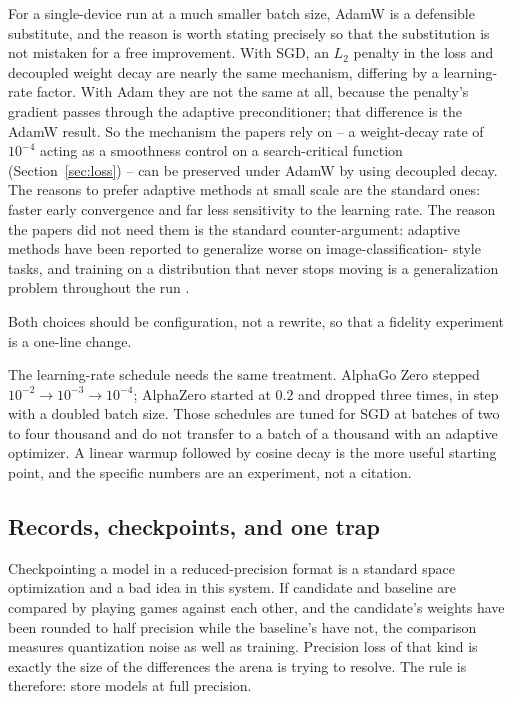 For a single-device run at a much smaller batch size, AdamW
\citep{kingma2014adam,loshchilov2017adamw} is a defensible substitute, and the
reason is worth stating precisely so that the substitution is not mistaken for a
free improvement. With SGD, an $L_2$ penalty in the loss and decoupled weight
decay are nearly the same mechanism, differing by a learning-rate factor. With
Adam they are not the same at all, because the penalty's gradient passes through
the adaptive preconditioner; that difference is the AdamW result. So the
mechanism the papers rely on -- a weight-decay rate of $10^{-4}$ acting as a
smoothness control on a search-critical function
(Section~\ref{sec:loss}) -- can be preserved under AdamW by using decoupled
decay. The reasons to prefer adaptive methods at small scale are the standard
ones: faster early convergence and far less sensitivity to the learning rate.
The reason the papers did not need them is the standard counter-argument:
adaptive methods have been reported to generalize worse on image-classification-
style tasks, and training on a distribution that never stops moving is a
generalization problem throughout the run \citep{wilson2017adaptive}.

Both choices should be configuration, not a rewrite, so that a fidelity
experiment is a one-line change.

The learning-rate schedule needs the same treatment. AlphaGo Zero stepped
$10^{-2} \to 10^{-3} \to 10^{-4}$; AlphaZero started at $0.2$ and dropped three
times, in step with a doubled batch size. Those schedules are tuned for SGD at
batches of two to four thousand and do not transfer to a batch of a thousand with
an adaptive optimizer. A linear warmup followed by cosine decay is the more
useful starting point, and the specific numbers are an experiment, not a
citation.

\subsection{Records, checkpoints, and one trap}
\label{sec:records}

Checkpointing a model in a reduced-precision format is a standard space
optimization and a bad idea in this system. If candidate and baseline are
compared by playing games against each other, and the candidate's weights have
been rounded to half precision while the baseline's have not, the comparison
measures quantization noise as well as training. Precision loss of that kind is
exactly the size of the differences the arena is trying to resolve. The rule is
therefore: store models at full precision.

